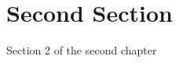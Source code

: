 \section{Second Section}
Section 2 of the second chapter \cite{exemplochapter2sec2} \cite{artigo2024chapter2sec2}

\printbibliography[heading=subbibliography, title={Referências da Seção 2.1}, keyword=chapter2secao2]